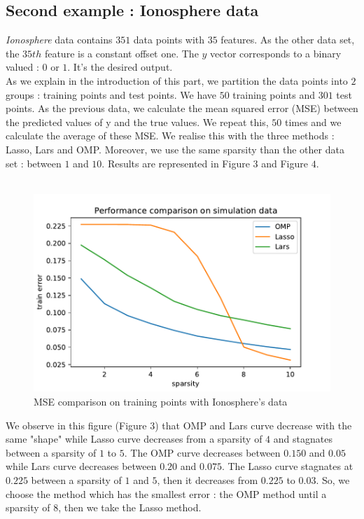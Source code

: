 \documentclass{article}
\begin{document}
\subsection{Second example : Ionosphere data}
\textit{Ionosphere} data contains $351$ data points with $35$ features. As the other data set, the $35th$ feature is a constant offset one. The $y$ vector corresponds to a binary valued : $0$ or $1$. It's the desired output.\\
As we explain in the introduction of this part, we partition the data points into $2$ groups : training points and test points. We have $50$ training points and $301$ test points. As the previous data, we calculate the mean squared error (MSE) between the predicted values of y and the true values. We repeat this, $50$ times and we calculate the average of these MSE. We realise this with the three methods : Lasso, Lars and OMP. Moreover, we use the same sparsity than the other data set : between $1$ and $10$. Results are represented in Figure $3$ and Figure $4$.\\
\\
\begin{figure}[!ht]
    \centering
    \includegraphics[scale=0.5]{./images/training_error_ionosphere.pdf}
    \caption{MSE comparison on training points with Ionosphere's data}
    \label{Figure 3}
\end{figure}
We observe in this figure (Figure $3$) that OMP and Lars curve decrease with the same "shape" while Lasso curve decreases from a sparsity of $4$ and stagnates between a sparsity of $1$ to $5$. The OMP curve decreases between $0.150$ and $0.05$ while Lars curve decreases between $0.20$ and $0.075$. The Lasso curve stagnates at $0.225$ between a sparsity of $1$ and $5$, then it decreases from $0.225$ to $0.03$. So, we choose the method which has the smallest error : the OMP method until a sparsity of $8$, then we take the Lasso method.\\
\end{document}
